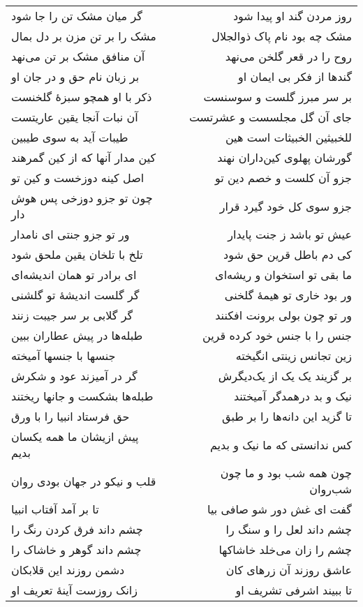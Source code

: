 \begin{center}
\begin{longtable}{l p{0.5cm} r}
گر میان مشک تن را جا شود
&&
روز مردن گند او پیدا شود
\\
مشک را بر تن مزن بر دل بمال
&&
مشک چه بود نام پاک ذوالجلال
\\
آن منافق مشک بر تن می‌نهد
&&
روح را در قعر گلخن می‌نهد
\\
بر زبان نام حق و در جان او
&&
گندها از فکر بی ایمان او
\\
ذکر با او همچو سبزهٔ گلخنست
&&
بر سر مبرز گلست و سوسنست
\\
آن نبات آنجا یقین عاریتست
&&
جای آن گل مجلسست و عشرتست
\\
طیبات آید به سوی طیبین
&&
للخبیثین الخبیثات است هین
\\
کین مدار آنها که از کین گمرهند
&&
گورشان پهلوی کین‌داران نهند
\\
اصل کینه دوزخست و کین تو
&&
جزو آن کلست و خصم دین تو
\\
چون تو جزو دوزخی پس هوش دار
&&
جزو سوی کل خود گیرد قرار
\\
ور تو جزو جنتی ای نامدار
&&
عیش تو باشد ز جنت پایدار
\\
تلخ با تلخان یقین ملحق شود
&&
کی دم باطل قرین حق شود
\\
ای برادر تو همان اندیشه‌ای
&&
ما بقی تو استخوان و ریشه‌ای
\\
گر گلست اندیشهٔ تو گلشنی
&&
ور بود خاری تو هیمهٔ گلخنی
\\
گر گلابی بر سر جیبت زنند
&&
ور تو چون بولی برونت افکنند
\\
طبله‌ها در پیش عطاران ببین
&&
جنس را با جنس خود کرده قرین
\\
جنسها با جنسها آمیخته
&&
زین تجانس زینتی انگیخته
\\
گر در آمیزند عود و شکرش
&&
بر گزیند یک یک از یک‌دیگرش
\\
طبله‌ها بشکست و جانها ریختند
&&
نیک و بد درهمدگر آمیختند
\\
حق فرستاد انبیا را با ورق
&&
تا گزید این دانه‌ها را بر طبق
\\
پیش ازیشان ما همه یکسان بدیم
&&
کس ندانستی که ما نیک و بدیم
\\
قلب و نیکو در جهان بودی روان
&&
چون همه شب بود و ما چون شب‌روان
\\
تا بر آمد آفتاب انبیا
&&
گفت ای غش دور شو صافی بیا
\\
چشم داند فرق کردن رنگ را
&&
چشم داند لعل را و سنگ را
\\
چشم داند گوهر و خاشاک را
&&
چشم را زان می‌خلد خاشاکها
\\
دشمن روزند این قلابکان
&&
عاشق روزند آن زرهای کان
\\
زانک روزست آینهٔ تعریف او
&&
تا ببیند اشرفی تشریف او

\end{longtable}
\end{center}
